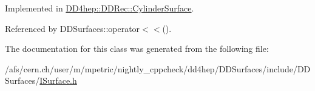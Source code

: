 Implemented in \hyperlink{class_d_d4hep_1_1_d_d_rec_1_1_cylinder_surface_ad07737fba21e42e21d521ce9dba2083b}{DD4hep::DDRec::CylinderSurface}.

Referenced by DDSurfaces::operator$<$$<$().

The documentation for this class was generated from the following file:\begin{DoxyCompactItemize}
\item 
/afs/cern.ch/user/m/mpetric/nightly\_\-cppcheck/dd4hep/DDSurfaces/include/DDSurfaces/\hyperlink{_i_surface_8h}{ISurface.h}\end{DoxyCompactItemize}
